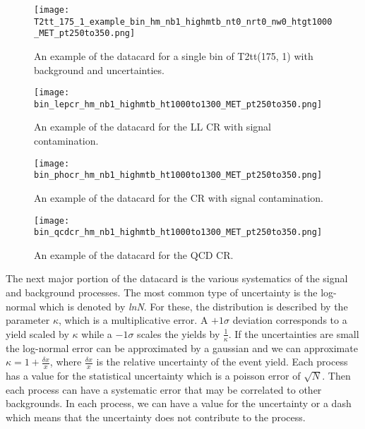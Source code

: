 \begin{figure}
	\begin{center}
  \texttt{[image: T2tt\_175\_1\_example\_bin\_hm\_nb1\_highmtb\_nt0\_nrt0\_nw0\_htgt1000\_MET\_pt250to350.png]}
	\end{center}
	\caption[Example Datacard of T2tt(175,1)]{An example of the datacard for a single bin of T2tt(175, 1) with background and uncertainties.
	 }
	\label{fig:example-datacard-sig}
\end{figure}
\begin{figure}
	\begin{center}
  \texttt{[image: bin\_lepcr\_hm\_nb1\_highmtb\_ht1000to1300\_MET\_pt250to350.png]}
	\end{center}
	\caption[Example Datacard of LL CR]{An example of the datacard for the LL CR with signal contamination.
	 }
	\label{fig:example-datacard-ll}
\end{figure}
\begin{figure}
	\begin{center}
  \texttt{[image: bin\_phocr\_hm\_nb1\_highmtb\_ht1000to1300\_MET\_pt250to350.png]}
	\end{center}
	\caption[Example Datacard of \Znunu{} CR]{An example of the datacard for the \Znunu{} CR with signal contamination.
	 }
	\label{fig:example-datacard-znunu}
\end{figure}
\begin{figure}
	\begin{center}
  \texttt{[image: bin\_qcdcr\_hm\_nb1\_highmtb\_ht1000to1300\_MET\_pt250to350.png]}
	\end{center}
	\caption[Example Datacard of QCD CR]{An example of the datacard for the QCD CR.
	 }
	\label{fig:example-datacard-qcd}
\end{figure}

The next major portion of the datacard is the various systematics of the signal and background processes. The most common type of uncertainty is the log-normal which is denoted by \textit{lnN}. For these, the distribution is described by the parameter $\kappa$, which is a multiplicative error. A $+1\sigma$ deviation corresponds to a yield scaled by $\kappa$ while a $-1\sigma$ scales the yields by $\frac{1}{\kappa}$. If the uncertainties are small the log-normal error can be approximated by a gaussian and we can approximate $\kappa=1+\frac{\delta x}{x}$, where $\frac{\delta x}{x}$ is the relative uncertainty of the event yield. Each process has a value for the statistical uncertainty which is a poisson error of $\sqrt{N}$. Then each process can have a systematic error that may be correlated to other backgrounds. In each process, we can have a value for the uncertainty or a dash which means that the uncertainty does not contribute to the process. 

